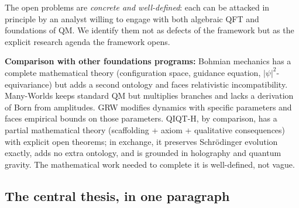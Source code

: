 \documentclass[11pt,a4paper]{article}
\begin{document}
The open problems are \emph{concrete and well-defined}: each can be attacked in principle by an analyst willing to engage with both algebraic QFT and foundations of QM. We identify them not as defects of the framework but as the explicit research agenda the framework opens.

\textbf{Comparison with other foundations programs:} Bohmian mechanics has a complete mathematical theory (configuration space, guidance equation, $|\psi|^2$-equivariance) but adds a second ontology and faces relativistic incompatibility. Many-Worlds keeps standard QM but multiplies branches and lacks a derivation of Born from amplitudes. GRW modifies dynamics with specific parameters and faces empirical bounds on those parameters. QIQT-H, by comparison, has a partial mathematical theory (scaffolding + axiom + qualitative consequences) with explicit open theorems; in exchange, it preserves Schrödinger evolution exactly, adds no extra ontology, and is grounded in holography and quantum gravity. The mathematical work needed to complete it is well-defined, not vague.

\subsection{The central thesis, in one paragraph}
\end{document}
